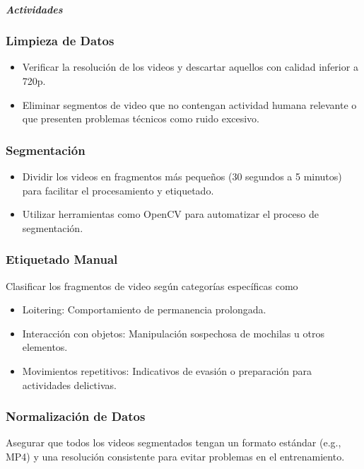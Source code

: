 \documentclass[listof=nochaptergap,12pt,times,authoryear]{report}
\begin{document}
\paragraph{\textit{Actividades}}

\subsubsection{Limpieza de Datos}

\begin{itemize}
    \item Verificar la resolución de los videos y descartar aquellos con calidad inferior a 720p.
    \item Eliminar segmentos de video que no contengan actividad humana relevante o que presenten problemas técnicos como ruido excesivo.
\end{itemize}


\subsubsection{Segmentación}
\begin{itemize}
    \item Dividir los videos en fragmentos más pequeños (30 segundos a 5 minutos) para facilitar el procesamiento y etiquetado.
    \item Utilizar herramientas como OpenCV para automatizar el proceso de segmentación.
\end{itemize}

\subsubsection{Etiquetado Manual}
Clasificar los fragmentos de video según categorías específicas como
\begin{itemize}
    \item Loitering: Comportamiento de permanencia prolongada.
    \item Interacción con objetos: Manipulación sospechosa de mochilas u otros elementos.
    \item Movimientos repetitivos: Indicativos de evasión o preparación para actividades delictivas.
\end{itemize}

\subsubsection{Normalización de Datos}
Asegurar que todos los videos segmentados tengan un formato estándar (e.g., MP4) y una resolución consistente para evitar problemas en el entrenamiento.
\end{document}
